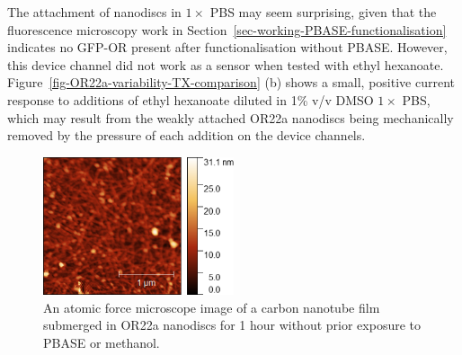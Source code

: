 \documentclass[
  a4paper,
]{scrbook}
\begin{document}
The attachment of nanodiscs in \(1 \times\) PBS may seem surprising,
given that the fluorescence microscopy work in
Section~\ref{sec-working-PBASE-functionalisation} indicates no GFP-OR
present after functionalisation without PBASE. However, this device
channel did not work as a sensor when tested with ethyl hexanoate.
Figure~\ref{fig-OR22a-variability-TX-comparison} (b) shows a small,
positive current response to additions of ethyl hexanoate diluted in 1\%
v/v DMSO \(1 \times\) PBS, which may result from the weakly attached
OR22a nanodiscs being mechanically removed by the pressure of each
addition on the device channels.

\begin{figure}

{\centering \includegraphics[width=0.5\textwidth,height=\textheight]{figures/ch8/00161_noPBASE.png}

}

\caption{\label{fig-OR22a-noPBASE-AFM}An atomic force microscope image
of a carbon nanotube film submerged in OR22a nanodiscs for 1 hour
without prior exposure to PBASE or methanol.}

\end{figure}
\end{document}
